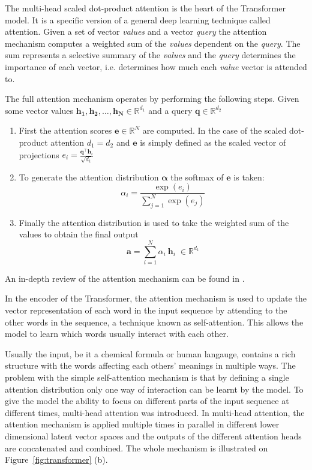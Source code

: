 The multi-head scaled dot-product attention is the heart of the Transformer model. It is a specific version of a general deep learning technique called attention. Given a set of vector \emph{values} and a vector \emph{query} the attention mechanism computes a weighted sum of the \emph{values} dependent on the \emph{query}. The sum represents a selective summary of the \emph{values} and the \emph{query} determines the importance of each vector, i.e. determines how much each \emph{value} vector is attended to. 

The full attention mechanism operates by performing the following steps. Given some vector values $\bm{h_1}, \bm{h_2},\dots, \bm{h_N} \in \mathbb{R} ^{d_1}$ and a query $\bm{q} \in \mathbb{R} ^{d_2}$ 

\begin{enumerate}
\item First the attention scores $\bm{e} \in \mathbb{R}^N$ are computed. In the case of the scaled dot-product attention $d_1=d_2$ and $\bm{e}$ is simply defined as the scaled vector of projections $e_i=\frac{\bm{q}^\intercal \bm{h}_i}{\sqrt{d_1}}$
\item To generate the attention distribution $\bm{\alpha}$ the softmax of $\bm{e}$ is taken: 
\begin{equation}
\alpha_i=\frac{\exp{(e_i)}}{\sum_{j=1}^N \exp{(e_j)}} 
\label{eqn:softmax}
\end{equation}
\item Finally the attention distribution is used to take the weighted sum of the values to obtain the final output
\begin{equation}
\bm{a}=\sum_{i=1}^N \alpha_i \: \bm{h}_i \; \in \mathbb{R}^{d_1}
\end{equation}
\end{enumerate}

An in-depth review of the attention mechanism can be found in \cite{Niu2021AttnReview}.

In the encoder of the Transformer, the attention mechanism is used to update the vector representation of each word in the input sequence by attending to the other words in the sequence, a technique known as self-attention. This allows the model to learn which words usually interact with each other.

Usually the input, be it a chemical formula or human langauge, contains a rich structure with the words affecting each others' meanings in multiple ways. The problem with the simple self-attention mechanism is that by defining a single attention distribution only one way of interaction can be learnt by the model. To give the model the ability to focus on different parts of the input sequence at different times, multi-head attention was introduced. In multi-head attention, the attention mechanism is applied multiple times in parallel in different lower dimensional latent vector spaces and the outputs of the different attention heads are concatenated and combined. The whole mechanism is illustrated on Figure~\ref{fig:transformer} (b).

